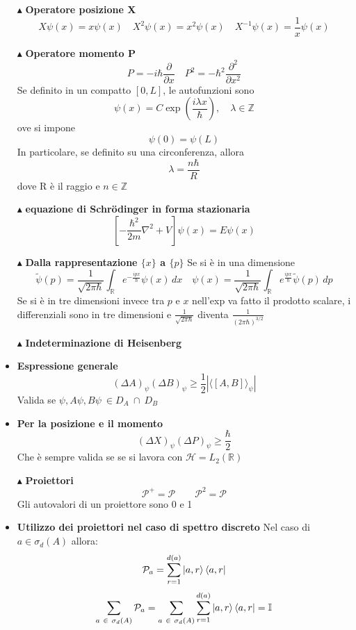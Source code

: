 \documentclass{book}
\newcommand{\g}{\textbf}
\newcommand{\e}{\begin{equation}}
\newcommand{\ex}{\end{equation} }
\renewcommand{\it}{\item[$\cdot$]}
\begin{document}
\begin{multicols}{4}
\begin{itemize}
    \item [$\blacktriangle$] \g{Operatore posizione X}
        \e{X\psi(x) = x\psi(x) \quad X^2\psi(x) = x^2\psi(x) \quad X^{-1}\psi(x) = \frac{1}{x} \psi(x)} \ex


\item [$\blacktriangle$] \g{Operatore momento P}
        \e{P = -i\hbar \frac{\partial}{\partial x} \quad P^2 = -\hbar^2 \frac{\partial^2}{\partial x^2}} \ex
    Se definito in un compatto $[0, L]$, le autofunzioni sono
        \e{\psi(x) = C \exp\left(\frac{i\lambda x}{\hbar}\right), \quad \lambda \in \mathbb{Z}} \ex
    ove si impone
        \e{\psi(0) = \psi(L)} \ex
    In particolare, se definito su una circonferenza, allora 
    \e {\lambda = \frac{n \hbar }{R}} \ex
    dove R è il raggio e $n \in \mathbb{Z}$
    \item[$\blacktriangle$] \g{equazione di Schrödinger in forma stazionaria}
        \e{\left[-\frac{\hbar^2}{2m} \nabla^2 + V\right] \psi(x) = E\psi(x)} \ex

 \item [$\blacktriangle$] \g{Dalla rappresentazione $\{x\}$ a $\{p\}$}
    Se si è in una dimensione
        \e{\tilde{\psi}(p) = \frac{1}{\sqrt{2\pi \hbar} }\int_{\mathbb{R}} e^{-\frac{ipx}{ \hbar}} \psi(x) \, dx \quad \psi(x) = \frac{1}{\sqrt{2\pi \hbar} }\int_{\mathbb{R}} e^{\frac{ipx}{\hbar}} \tilde{\psi}(p) \, dp} \ex
    Se si è in tre dimensioni invece tra $p$ e $x$ nell'exp va fatto il prodotto scalare, i differenziali sono in tre dimensioni e $\frac{1}{\sqrt{2 \pi \hbar}}$ diventa $\frac{1}{\left(2 \pi \hbar \right)^{3/2}}$
\item [$\blacktriangle$] \g{Indeterminazione di Heisenberg}
    \it \g{Espressione generale}
        \e{(\Delta A)_\psi (\Delta B)_\psi \geq \frac{1}{2}\left|{\langle [A, B] \rangle_\psi} \right|} \ex
        Valida se $\psi, A\psi, B\psi \ \in D_{A} \ \cap \ D_{B}$
        \it \g{Per la posizione e il momento}
        \e{(\Delta X)_{\psi}(\Delta P)_{\psi} \geq \frac{\hbar}{2}}\ex
        Che è sempre valida se se si lavora con $\mathcal{H} = L_{2}(\mathbb{R})$

\item [$\blacktriangle$] \g{Proiettori}
\e{\mathcal{P}^{+} = \mathcal{P} \qquad \mathcal{P}^{2} = \mathcal{P}}\ex
Gli autovalori di un proiettore sono 0 e 1 
\it \g{Utilizzo dei proiettori nel caso di spettro discreto}
Nel caso di $a \in \sigma_{d}(A)$ allora:
\e{\mathcal{P}_{a} = \sum_{r=1}^{d(a)}\ket{a,r}\bra{a,r}}\ex
\e{\sum_{a \ \in \ \sigma_{d}(A)}\mathcal{P}_{a} = \sum_{a \ \in \ \sigma_{d}(A)} \sum_{r = 1}^{d(a)}\ket{a,r}\bra{a,r} = \mathbb{I}}\ex


\end{itemize}
\end{multicols}
\end{document}
